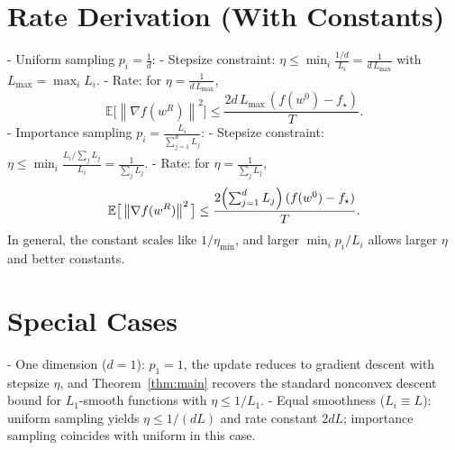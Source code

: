 \documentclass[11pt]{article}
\newcommand{\E}{\mathbb{E}}
\newcommand{\1}{\mathbbm{1}}
\newcommand{\norm}[1]{\left\lVert #1 \right\rVert}
\begin{document}
\section*{Rate Derivation (With Constants)}
- Uniform sampling $p_i=\tfrac{1}{d}$:
  - Stepsize constraint: $\eta \le \min_i \tfrac{1/d}{L_i} = \tfrac{1}{d\,L_{\max}}$ with $L_{\max}=\max_i L_i$.
  - Rate: for $\eta=\tfrac{1}{d\,L_{\max}}$, 
  \[
  \E\big[\norm{\nabla f(w^R)}^2\big] \le \frac{2d\,L_{\max}\,(f(w^0)-f_\star)}{T}.
  \]
- Importance sampling $p_i=\tfrac{L_i}{\sum_{j=1}^d L_j}$:
  - Stepsize constraint: $\eta \le \min_i \tfrac{L_i/\sum_j L_j}{L_i} = \tfrac{1}{\sum_j L_j}$.
  - Rate: for $\eta=\tfrac{1}{\sum_j L_j}$,
  \[
  \E\big[\norm{\nabla f(w^R)}^2\big] \le \frac{2\Bigl(\sum_{j=1}^d L_j\Bigr)\,(f(w^0)-f_\star)}{T}.
  \]
In general, the constant scales like $1/\eta_{\min}$, and larger $\min_i p_i/L_i$ allows larger $\eta$ and better constants.

\section*{Special Cases}
- One dimension ($d=1$): $p_1=1$, the update reduces to gradient descent with stepsize $\eta$, and Theorem~\ref{thm:main} recovers the standard nonconvex descent bound for $L_1$-smooth functions with $\eta\le 1/L_1$.
- Equal smoothness ($L_i\equiv L$): uniform sampling yields $\eta\le 1/(dL)$ and rate constant $2dL$; importance sampling coincides with uniform in this case.
\end{document}
